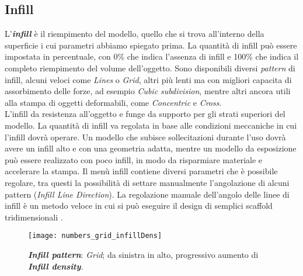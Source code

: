 \subsection{Infill}
L'\emph{\textbf{infill}} è il riempimento del modello, quello che si trova all'interno della superficie i cui parametri abbiamo spiegato prima. La quantità di infill può essere impostata in percentuale, con 0\% che indica l'assenza di infill e 100\% che indica il completo riempimento del volume dell'oggetto. Sono disponibili diversi \emph{pattern} di infill, alcuni veloci come \emph{Lines} o \emph{Grid}, altri più lenti ma con migliori capacita di assorbimento delle forze, ad esempio \emph{Cubic subdivision}, mentre altri ancora utili alla stampa di oggetti deformabili, come \emph{Concentric} e \emph{Cross}.\\
L'infill da resistenza all'oggetto e funge da supporto per gli strati superiori del modello. La quantità di infill va regolata in base alle condizioni meccaniche in cui l'infill dovrà operare. Un modello che subisce sollecitazioni durante l'uso dovrà avere un infill alto e con una geometria adatta, mentre un modello da esposizione può essere realizzato con poco infill, in modo da risparmiare materiale e accelerare la stampa.
Il menù infill contiene diversi parametri che è possibile regolare, tra questi la possibilità di settare manualmente l'angolazione di alcuni pattern (\emph{Infill Line Direction}). La regolazione manuale dell'angolo delle linee di infill è un metodo veloce in cui si può eseguire il design di semplici scaffold tridimensionali \parencite{Reference138}.

\begin{figure}[h]
    \centering
    \texttt{[image: numbers\_grid\_infillDens]}
    \caption{\emph{\textbf{Infill pattern}}: \emph{Grid}; da sinistra in alto, progressivo aumento di \emph{\textbf{Infill density}}.}
    \label{fig:numbers_grid_infillDens}
\end{figure}
	

